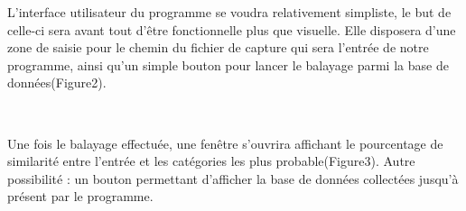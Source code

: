 \documentclass[a4paper, 12pt, twoside]{article}
\begin{document}
L'interface utilisateur du programme se voudra relativement simpliste, le but de celle-ci sera avant tout d'être fonctionnelle plus que visuelle. 
Elle disposera d'une zone de saisie pour le chemin du fichier de capture qui sera l'entrée de notre programme, ainsi qu'un simple bouton pour lancer le balayage parmi la base de données(Figure2).

~\par
Une fois le balayage effectuée, une fenêtre s'ouvrira affichant le pourcentage de similarité entre l'entrée et les catégories les plus probable(Figure3). 
Autre possibilité : un bouton permettant d'afficher la base de données collectées jusqu'à présent par le programme.
\end{document}
